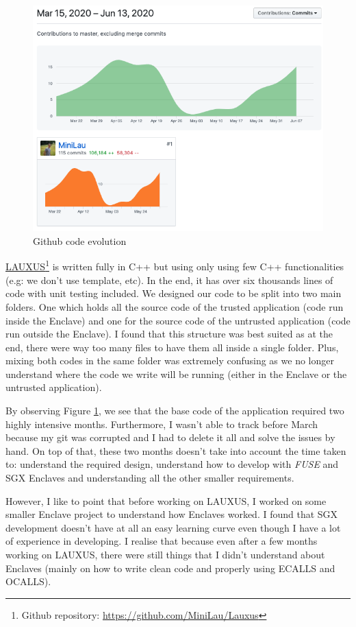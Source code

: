 \documentclass[../main.tex]{subfiles}
\begin{document}
\begin{figure}[h]
    \centering
    \includegraphics[width=\textwidth]{images/appendix/github_contribution}
    
    \caption{Github code evolution}
    \label{appendix:figure:github_contribution}
\end{figure}

\par \href{https://github.com/MiniLau/Lauxus}{LAUXUS}\footnote{Github repository: \href{https://github.com/MiniLau/Lauxus}{https://github.com/MiniLau/Lauxus}} is written fully in C++ but using only using few C++ functionalities (e.g: we don't use template, etc). In the end, it has over six thousands lines of code with unit testing included. We designed our code to be split into two main folders. One which holds all the source code of the trusted application (code run inside the Enclave) and one for the source code of the untrusted application (code run outside the Enclave). I found that this structure was best suited as at the end, there were way too many files to have them all inside a single folder. Plus, mixing both codes in the same folder was extremely confusing as we no longer understand where the code we write will be running (either in the Enclave or the untrusted application). 
\par By observing Figure \ref{appendix:figure:github_contribution}, we see that the base code of the application required two highly intensive months. Furthermore, I wasn't able to track before March because my git was corrupted and I had to delete it all and solve the issues by hand. On top of that, these two months doesn't take into account the time taken to: understand the required design, understand how to develop with \textit{FUSE} and SGX Enclaves and understanding all the other smaller requirements.
\par However, I like to point that before working on LAUXUS, I worked on some smaller Enclave project to understand how Enclaves worked. I found that SGX development doesn't have at all an easy learning curve even though I have a lot of experience in developing. I realise that because even after a few months working on LAUXUS, there were still things that I didn't understand about Enclaves (mainly on how to write clean code and properly using ECALLS and OCALLS).
\end{document}
